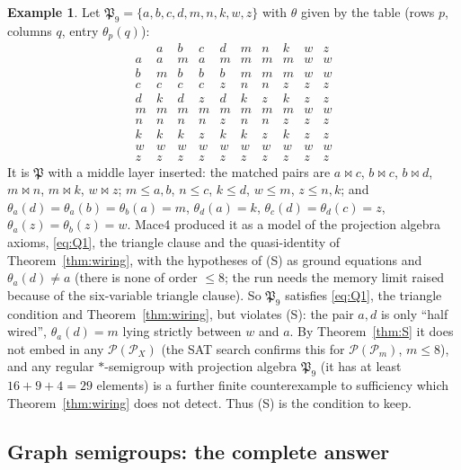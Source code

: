 \documentclass[11pt]{amsart}
\theoremstyle{definition}
\newtheorem{example}[theorem]{Example}
\renewcommand{\P}{\mathcal{P}}
\begin{document}
\begin{example}\label{ex:P9}
Let $\mathfrak P_9=\{a,b,c,d,m,n,k,w,z\}$ with $\theta$ given by the table (rows $p$, columns $q$, entry $\theta_p(q)$):
\[
\begin{array}{c|ccccccccc}
 & a & b & c & d & m & n & k & w & z\\ \hline
a & a & m & a & m & m & m & m & w & w\\
b & m & b & b & b & m & m & m & w & w\\
c & c & c & c & z & n & n & z & z & z\\
d & k & d & z & d & k & z & k & z & z\\
m & m & m & m & m & m & m & m & w & w\\
n & n & n & n & z & n & n & z & z & z\\
k & k & k & z & k & k & z & k & z & z\\
w & w & w & w & w & w & w & w & w & w\\
z & z & z & z & z & z & z & z & z & z
\end{array}
\]
It is $\mathfrak P$ with a middle layer inserted: the matched pairs are $a\bowtie c$, $b\bowtie c$, $b\bowtie d$, $m\bowtie n$, $m\bowtie k$, $w\bowtie z$; $m\le a,b$, $n\le c$, $k\le d$, $w\le m$, $z\le n,k$; and $\theta_a(d)=\theta_a(b)=\theta_b(a)=m$, $\theta_d(a)=k$, $\theta_c(d)=\theta_d(c)=z$, $\theta_a(z)=\theta_b(z)=w$. Mace4 produced it as a model of the projection algebra axioms, \eqref{eq:Q1}, the triangle clause and the quasi-identity of Theorem~\ref{thm:wiring}, with the hypotheses of (S) as ground equations and $\theta_a(d)\ne a$ (there is none of order $\le8$; the run needs the memory limit raised because of the six-variable triangle clause). So $\mathfrak P_9$ satisfies \eqref{eq:Q1}, the triangle condition and Theorem~\ref{thm:wiring}, but violates (S): the pair $a,d$ is only ``half wired'', $\theta_a(d)=m$ lying strictly between $w$ and $a$. By Theorem~\ref{thm:S} it does not embed in any $\P(\P_X)$ (the SAT search confirms this for $\P(\P_m)$, $m\le8$), and any regular $*$-semigroup with projection algebra $\mathfrak P_9$ (it has at least $16+9+4=29$ elements) is a further finite counterexample to sufficiency which Theorem~\ref{thm:wiring} does not detect. Thus (S) is the condition to keep.
\end{example}

\subsection{Graph semigroups: the complete answer}\label{subsec:graphthm}
\end{document}
